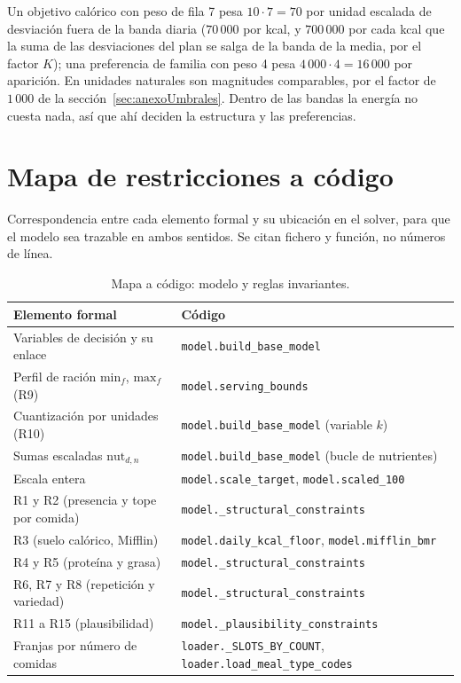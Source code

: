 Un objetivo calórico con peso de fila 7 pesa $10 \cdot 7 = 70$ por unidad escalada de desviación fuera de la banda diaria ($70\,000$ por kcal, y $700\,000$ por cada kcal que la suma de las desviaciones del plan se salga de la banda de la media, por el factor $K$); una preferencia de familia con peso 4 pesa $4\,000 \cdot 4 = 16\,000$ por aparición. En unidades naturales son magnitudes comparables, por el factor de $1\,000$ de la sección~\ref{sec:anexoUmbrales}. Dentro de las bandas la energía no cuesta nada, así que ahí deciden la estructura y las preferencias.

\section{Mapa de restricciones a código}
\label{sec:anexoMapa}

Correspondencia entre cada elemento formal y su ubicación en el solver, para que el modelo sea trazable en ambos sentidos. Se citan fichero y función, no números de línea.

\begin{table}[htbp]
\centering
\small
\begin{tabular}{|l|p{7.3cm}|}
\hline
\textbf{Elemento formal} & \textbf{Código} \\
\hline
Variables de decisión y su enlace & \texttt{model.build\_base\_model} \\
\hline
Perfil de ración $\text{min}_f$, $\text{max}_f$ (R9) & \texttt{model.serving\_bounds} \\
\hline
Cuantización por unidades (R10) & \texttt{model.build\_base\_model} (variable $k$) \\
\hline
Sumas escaladas $\text{nut}_{d,n}$ & \texttt{model.build\_base\_model} (bucle de nutrientes) \\
\hline
Escala entera & \texttt{model.scale\_target}, \texttt{model.scaled\_100} \\
\hline
R1 y R2 (presencia y tope por comida) & \texttt{model.\_structural\_constraints} \\
\hline
R3 (suelo calórico, Mifflin) & \texttt{model.daily\_kcal\_floor}, \texttt{model.mifflin\_bmr} \\
\hline
R4 y R5 (proteína y grasa) & \texttt{model.\_structural\_constraints} \\
\hline
R6, R7 y R8 (repetición y variedad) & \texttt{model.\_structural\_constraints} \\
\hline
R11 a R15 (plausibilidad) & \texttt{model.\_plausibility\_constraints} \\
\hline
Franjas por número de comidas & \texttt{loader.\_SLOTS\_BY\_COUNT}, \texttt{loader.load\_meal\_type\_codes} \\
\hline
\end{tabular}
\caption{Mapa a código: modelo y reglas invariantes.}
\label{tab:anexoMapaModelo}
\end{table}

